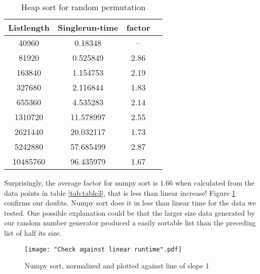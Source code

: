 \documentclass[sigconf, nonacm, natbib, screen, balance=False]{acmart}
\begin{document}
\begin{table}[ht]
\caption{Heap sort for random permutation }
\label{tab:table2}
\begin{center}
\begin{tabular}{|c|c|c|c|} 
\hline
\textbf{Listlength} & 	\textbf{Singlerun-time} & \textbf{factor} \\ 
\hline
40960 &  0.18348 &  --  \\ 
81920 &  0.525849 &  2.86 \\ 
163840 &  1.154753 &  2.19 \\ 
327680 &  2.116844 &  1.83 \\ 
655360 &  4.535283 &  2.14 \\ 
1310720 &  11.578997 &  2.55 \\ 
2621440 &  20.032117 &  1.73 \\ 
5242880 &  57.685499 &  2.87 \\ 
10485760 &  96.435979 &  1.67 \\ 
\hline
\end{tabular}
\end{center}
\end{table}

 Surprisingly, the average factor for numpy sort is $1.66$ when calculated from the data points in table \ref{tab:table3}, that is less than linear increase!  Figure \ref{fig:numpylinear} confirms our doubts. Numpy sort does it in less than linear time for the data we tested. One possible explanation could be that the larger size data generated by our random number generator produced a easily sortable list than the preceding list of half its size.

\begin{figure}[ht]
\texttt{[image: "Check against linear runtime".pdf]}
    \caption{Numpy sort, normalized and plotted against line of slope 1 }
    \label{fig:numpylinear}
\end{figure}
\end{document}
